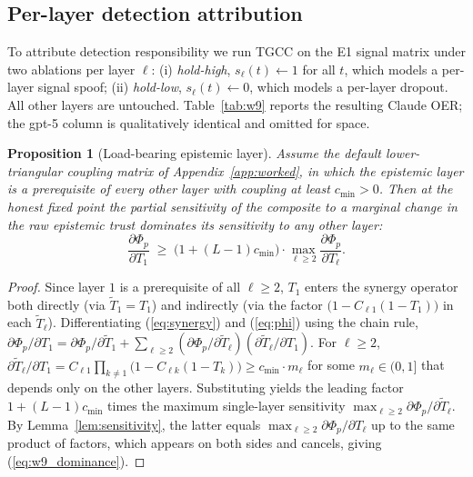\documentclass[sigconf,anonymous]{acmart}
\theoremstyle{plain}
\newtheorem{proposition}{Proposition}
\theoremstyle{definition}
\theoremstyle{remark}
\begin{document}
\subsection{Per-layer detection attribution}
\label{app:w9}
To attribute detection responsibility we run TGCC on the E1 signal
matrix under two ablations per layer $\ell$: (i) \emph{hold-high},
$s_\ell(t)\leftarrow 1$ for all $t$, which models a per-layer signal
spoof; (ii) \emph{hold-low}, $s_\ell(t)\leftarrow 0$, which models a
per-layer dropout.  All other layers are untouched.
Table~\ref{tab:w9} reports the resulting Claude OER; the gpt-5 column is
qualitatively identical and omitted for space.

\begin{proposition}[Load-bearing epistemic layer]
\label{prop:w9}
Assume the default lower-triangular coupling matrix of
Appendix~\ref{app:worked}, in which the epistemic layer is a
prerequisite of every other layer with coupling at least $c_{\min}>0$.
Then at the honest fixed point the partial sensitivity of the composite
to a marginal change in the raw epistemic trust dominates its
sensitivity to any other layer:
\begin{equation}
\frac{\partial\Phi_p}{\partial T_1}\;\ge\;
\bigl(1+(L-1)c_{\min}\bigr)\cdot
\max_{\ell\ge 2}\frac{\partial\Phi_p}{\partial T_\ell}.
\label{eq:w9_dominance}
\end{equation}
\end{proposition}

\begin{proof}
Since layer $1$ is a prerequisite of all $\ell\ge 2$,
$T_1$ enters the synergy operator both directly (via $\tilde T_1=T_1$)
and indirectly (via the factor $\bigl(1-C_{\ell 1}(1-T_1)\bigr)$ in each
$\tilde T_\ell$).  Differentiating (\ref{eq:synergy}) and
(\ref{eq:phi}) using the chain rule,
$\partial\Phi_p/\partial T_1=\partial\Phi_p/\partial\tilde T_1+
\sum_{\ell\ge 2}(\partial\Phi_p/\partial\tilde T_\ell)
(\partial\tilde T_\ell/\partial T_1)$.
For $\ell\ge 2$, $\partial\tilde T_\ell/\partial T_1=C_{\ell 1}\prod_{k\ne 1}
\bigl(1-C_{\ell k}(1-T_k)\bigr)\ge c_{\min}\cdot m_\ell$ for some
$m_\ell\in(0,1]$ that depends only on the other layers.  Substituting
yields the leading factor $1+(L-1)c_{\min}$ times the maximum
single-layer sensitivity $\max_{\ell\ge 2}\partial\Phi_p/\partial
\tilde T_\ell$.  By Lemma~\ref{lem:sensitivity}, the latter equals
$\max_{\ell\ge 2}\partial\Phi_p/\partial T_\ell$ up to the same product
of factors, which appears on both sides and cancels, giving
(\ref{eq:w9_dominance}).
\end{proof}
\end{document}
